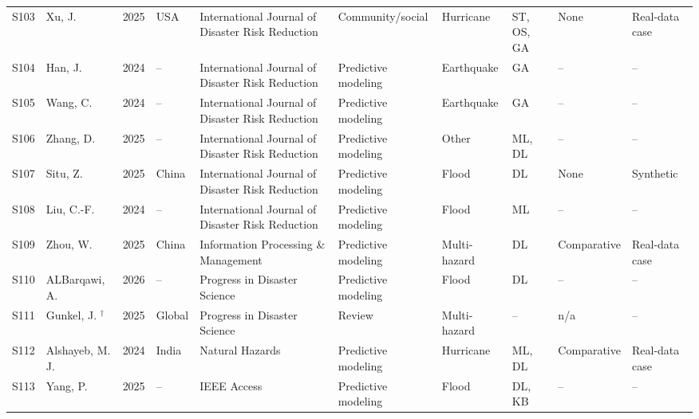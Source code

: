 \begin{landscape}
\begin{longtable}{@{}L{0.9cm}L{2.9cm}L{0.8cm}L{2.1cm}L{3.1cm}L{2.4cm}L{2.0cm}L{1.8cm}L{2.1cm}L{2.0cm}@{}}
S103 & Xu, J. \cite{Xu2025LargeLanguageAgentHousehold} & 2025 & USA & International Journal of Disaster Risk Reduction & Community/social & Hurricane & ST, OS, GA & None & Real-data case \\
S104 & Han, J. \cite{Han2024EnhancedEarthquakeImpact} & 2024 & -- & International Journal of Disaster Risk Reduction & Predictive modeling & Earthquake & GA & -- & -- \\
S105 & Wang, C. \cite{Wang2024NearRealTimeFatalityEstimation} & 2024 & -- & International Journal of Disaster Risk Reduction & Predictive modeling & Earthquake & GA & -- & -- \\
S106 & Zhang, D. \cite{Zhang2025TornadoGraphNeuralNetworks} & 2025 & -- & International Journal of Disaster Risk Reduction & Predictive modeling & Other & ML, DL & -- & -- \\
S107 & Situ, Z. \cite{Situ2025AttentionFloodDamageRisk} & 2025 & China & International Journal of Disaster Risk Reduction & Predictive modeling & Flood & DL & None & Synthetic \\
S108 & Liu, C.-F. \cite{Liu2024FloodDamageCastNowcasting} & 2024 & -- & International Journal of Disaster Risk Reduction & Predictive modeling & Flood & ML & -- & -- \\
S109 & Zhou, W. \cite{Zhou2025ClassificationSeverityDisasterLosses} & 2025 & China & Information Processing \& Management & Predictive modeling & Multi-hazard & DL & Comparative & Real-data case \\
S110 & ALBarqawi, A. \cite{ALBarqawi2026FloodInundationDeepLearning} & 2026 & -- & Progress in Disaster Science & Predictive modeling & Flood & DL & -- & -- \\
S111 & Gunkel, J. \cite{Gunkel2025MachineLearningHumanMobility}$^{\dagger}$ & 2025 & Global & Progress in Disaster Science & Review & Multi-hazard & -- & n/a & -- \\
S112 & Alshayeb, M. J. \cite{Alshayeb2024ExplainableStormSurgeSusceptibility} & 2024 & India & Natural Hazards & Predictive modeling & Hurricane & ML, DL & Comparative & Real-data case \\
S113 & Yang, P. \cite{Yang2025KnowledgeGraphGraphNeuralFloodRisk} & 2025 & -- & IEEE Access & Predictive modeling & Flood & DL, KB & -- & -- \\
\end{longtable}
\normalsize
\end{landscape}
